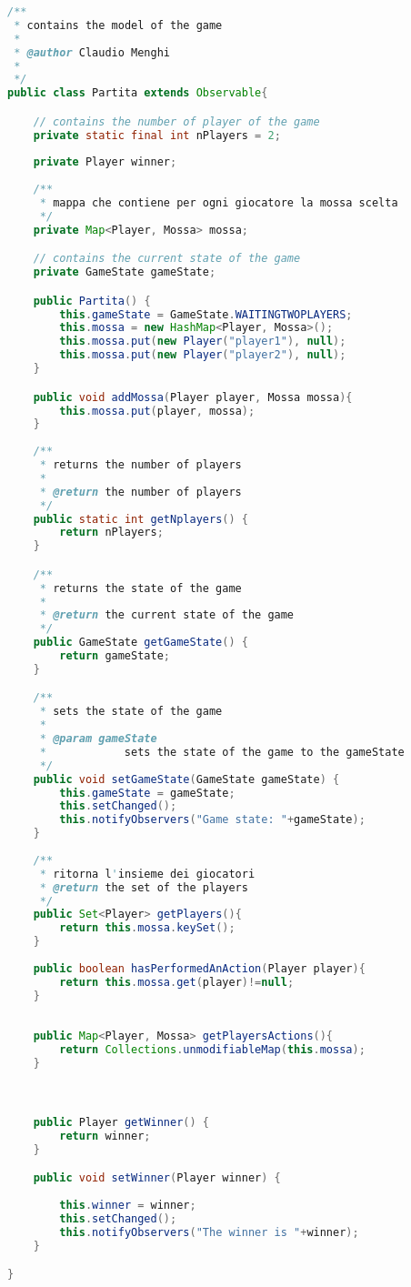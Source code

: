 \documentclass{article}
\begin{document}
\begin{lstlisting}[language=Java,escapechar=|]
/**
 * contains the model of the game
 * 
 * @author Claudio Menghi
 * 
 */
public class Partita extends Observable{

	// contains the number of player of the game
	private static final int nPlayers = 2;
	
	private Player winner;
	
	/**
	 * mappa che contiene per ogni giocatore la mossa scelta
	 */
	private Map<Player, Mossa> mossa;

	// contains the current state of the game
	private GameState gameState;

	public Partita() {
		this.gameState = GameState.WAITINGTWOPLAYERS;
		this.mossa = new HashMap<Player, Mossa>();
		this.mossa.put(new Player("player1"), null);
		this.mossa.put(new Player("player2"), null);
	}

	public void addMossa(Player player, Mossa mossa){
		this.mossa.put(player, mossa);
	}
	
	/**
	 * returns the number of players
	 * 
	 * @return the number of players
	 */
	public static int getNplayers() {
		return nPlayers;
	}

	/**
	 * returns the state of the game
	 * 
	 * @return the current state of the game
	 */
	public GameState getGameState() {
		return gameState;
	}

	/**
	 * sets the state of the game
	 * 
	 * @param gameState
	 *            sets the state of the game to the gameState
	 */
	public void setGameState(GameState gameState) {
		this.gameState = gameState;
		this.setChanged();
		this.notifyObservers("Game state: "+gameState);
	}
	
	/**
	 * ritorna l'insieme dei giocatori
	 * @return the set of the players
	 */
	public Set<Player> getPlayers(){
		return this.mossa.keySet();
	}
	
	public boolean hasPerformedAnAction(Player player){
		return this.mossa.get(player)!=null;
	}
	
	
	public Map<Player, Mossa> getPlayersActions(){
		return Collections.unmodifiableMap(this.mossa);
	}



	public Player getWinner() {
		return winner;
	}

	public void setWinner(Player winner) {
		
		this.winner = winner;
		this.setChanged();
		this.notifyObservers("The winner is "+winner);
	}

}
\end{lstlisting}
\end{document}
